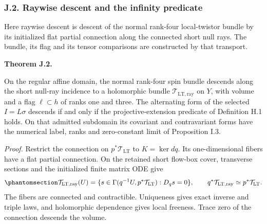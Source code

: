\documentclass[
  english,
  11pt,
  reqno]{amsart}
\makeatletter
\newcommand{\pandocstatementheading}[1]{%
  \par\addpenalty{\@beginparpenalty}%
  \addvspace{.5\baselineskip plus .2\baselineskip minus .2\baselineskip}%
  {\normalfont\bfseries #1\par}%
  \nobreak\@afterindenttrue\@afterheading
}
\makeatother
\begin{document}
\protect{}\label{sec:gg-relative-ward-descent}

\subsubsection{J.2. Raywise descent and the infinity
predicate}\label{j.2.-raywise-descent-and-the-infinity-predicate}

Here raywise descent is descent of the normal rank-four local-twistor
bundle by its initialized flat partial connection along the connected
short null rays. The bundle, its flag and its tensor comparisons are
constructed by that transport.

\pandocstatementheading{\protect{}\label{thm:gg-derived-ward-datum}Theorem J.2.}

On the regular affine domain, the normal rank-four spin bundle descends
along the short null-ray incidence to a holomorphic bundle
\(\mathcal T_{\mathrm{LT,ray}}\) on \(Y\), with volume and a flag
\(\ell\subset h\) of ranks one and three. The alternating form of the
selected \(I=L\sigma\) descends if and only if the projective-extension
predicate of Definition H.1 holds. On that admitted subdomain its
covariant and contravariant forms have the numerical label, ranks and
zero-constant limit of Proposition I.3.

\emph{Proof.} Restrict the connection on \(p^*\mathcal T_{\mathrm{LT}}\)
to \(K=\ker dq\). Its one-dimensional fibers have a flat partial
connection. On the retained short flow-box cover, transverse sections
and the initialized finite matrix ODE give
\begin{equation}\protect\phantomsection\label{eq:gg-ward-descent}{
 \mathcal T_{\mathrm{LT,ray}}(U)
 =\{s\in\Gamma(q^{-1}U,p^*\mathcal T_{\mathrm{LT}}):D_qs=0\},
 \qquad q^*\mathcal T_{\mathrm{LT,ray}}\simeq p^*\mathcal T_{\mathrm{LT}}.
}\end{equation} The fibers are connected and contractible. Uniqueness
gives exact inverse and triple laws, and holomorphic dependence gives
local freeness. Trace zero of the connection descends the volume.
\end{document}
